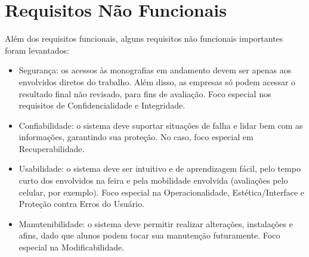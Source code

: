 \section{Requisitos Não Funcionais}
Além dos requisitos funcionais, alguns requisitos não funcionais importantes foram levantados:

\begin{itemize}
    \item Segurança: os acessos às monografias em andamento devem ser apenas aos envolvidos diretos do trabalho. Além disso, as empresas só podem acessar o resultado final não revisado, para fins de avaliação. Foco especial nos requisitos de Confidencialidade e Integridade.
    \item Confiabilidade: o sistema deve suportar situações de falha e lidar bem com as informações, garantindo sua proteção. No caso, foco especial em Recuperabilidade.
    \item Usabilidade: o sistema deve ser intuitivo e de aprendizagem fácil, pelo tempo curto dos envolvidos na feira e pela mobilidade envolvida (avaliações pelo celular, por exemplo). Foco especial na Operacionalidade, Estética/Interface e Proteção contra Erros do Usuário.
    \item Manutenibilidade: o sistema deve permitir realizar alterações, instalações e afins, dado que alunos podem tocar sua manutenção futuramente. Foco especial na Modificabilidade.
\end{itemize}